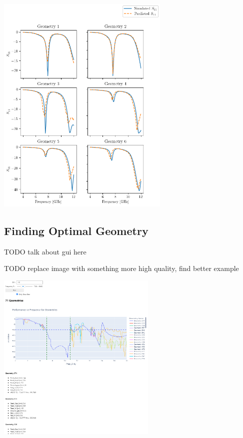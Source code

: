\documentclass[lettersize,journal]{IEEEtran}
\newenvironment{Figure}
    {\par\medskip\noindent\minipage{\linewidth}}
    {\endminipage\par\medskip}
\begin{document}
\begin{Figure}
    \centering
    \includegraphics[width=3.25in]{unseen_geometries_freq_vs_seq}
    \label{unseen_geometries_graph}
\end{Figure}

\subsection{Finding Optimal Geometry}
TODO talk about gui here 

TODO replace image with something more high quality, find better example 

\begin{Figure}
    \centering
    \includegraphics[width=3in]{gui}
    \label{gui}
\end{Figure}
\end{document}
